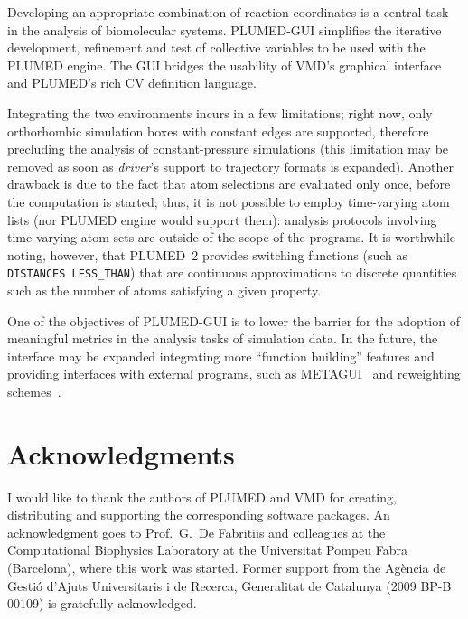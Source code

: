 \documentclass[preprint,review,11pt]{elsarticle}
\begin{document}
Developing an appropriate combination of reaction coordinates is a
central task in the analysis of biomolecular systems.  PLUMED-GUI
simplifies the iterative development, refinement and test of
collective variables to be used with the PLUMED engine.  The GUI
bridges the usability of VMD's graphical interface and PLUMED's rich
CV definition language.  

Integrating the two environments incurs in a few limitations; right
now, only orthorhombic simulation boxes with constant edges are
supported, therefore precluding the analysis of constant-pressure
simulations (this limitation may be removed as soon as \emph{driver}'s
support to trajectory formats is expanded). Another drawback is due to
the fact that atom selections are evaluated only once, before the
computation is started; thus, it is not possible to employ
time-varying atom lists (nor PLUMED engine would support them):
analysis protocols involving time-varying atom sets are outside of the
scope of the programs. It is worthwhile noting, however, that PLUMED~2
provides switching functions (such as \texttt{DISTANCES LESS\_THAN})
that are continuous approximations to discrete quantities
such as the number of atoms satisfying a given property.

One of the objectives of PLUMED-GUI is to lower the barrier for the
adoption of meaningful metrics in the analysis tasks of simulation
data. In the future, the interface may be expanded integrating more
``function building'' features and providing interfaces with external
programs, such as METAGUI~\cite{Biarnes_Pietrucci_Marinelli_Laio_2012}
and reweighting schemes~\cite{Bonomi_Barducci_Parrinello_2009}.





\section{Acknowledgments}

I would like to thank the authors of PLUMED and VMD for creating,
distributing and supporting the corresponding software packages. An
acknowledgment goes to Prof.\ G.\ De Fabritiis and colleagues at the
Computational Biophysics Laboratory at the Universitat Pompeu Fabra
(Barcelona), where this work was started. Former support from the
Ag\`encia de Gesti\'o d'Ajuts Universitaris i de Recerca, Generalitat
de Catalunya (2009 BP-B 00109) is gratefully acknowledged.
\end{document}
